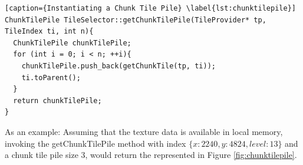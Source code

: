 \begin{lstlisting}[caption={Instantiating a Chunk Tile Pile} \label{lst:chunktilepile}]
ChunkTilePile TileSelector::getChunkTilePile(TileProvider* tp, TileIndex ti, int n){
  ChunkTilePile chunkTilePile;
  for (int i = 0; i < n; ++i){
    chunkTilePile.push_back(getChunkTile(tp, ti));
    ti.toParent();
  }
  return chunkTilePile;
}
\end{lstlisting}

As an example: 
Assuming that the texture data is available in local memory, invoking the getChunkTilePile method with index $\{x: 2240, y: 4824, level: 13 \}$ and a chunk tile pile size 3, would return the  represented in Figure \ref{fig:chunktilepile}. 

